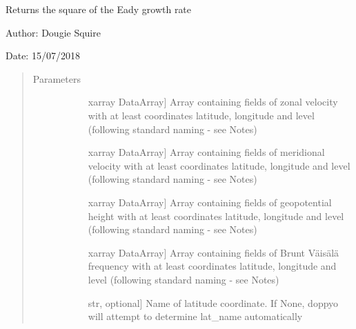 \documentclass[letterpaper,10pt,english]{sphinxmanual}
\begin{document}
\begin{fulllineitems}
\end{fulllineitems}


\begin{fulllineitems}
\label{\detokenize{diagnostic_doc:diagnostic.Eady_growth_rate}}
Returns the square of the Eady growth rate

\begin{DUlineblock}{0em}
\item[] Author: Dougie Squire
\item[] Date: 15/07/2018
\end{DUlineblock}
\begin{quote}\begin{description}
\item[{Parameters}] \leavevmode\begin{description}
\item[{}] \leavevmode{[}xarray DataArray{]}
Array containing fields of zonal velocity with at least coordinates latitude, longitude and                     level (following standard naming - see Notes)

\item[{}] \leavevmode{[}xarray DataArray{]}
Array containing fields of meridional velocity with at least coordinates latitude, longitude                     and level (following standard naming - see Notes)

\item[{}] \leavevmode{[}xarray DataArray{]}
Array containing fields of geopotential height with at least coordinates latitude, longitude                     and level (following standard naming - see Notes)

\item[{}] \leavevmode{[}xarray DataArray{]}
Array containing fields of Brunt Väisälä frequency with at least coordinates latitude,                     longitude and level (following standard naming - see Notes)

\item[{}] \leavevmode{[}str, optional{]}
Name of latitude coordinate. If None, doppyo will attempt to determine lat\_name                     automatically


\end{description}
\end{description}
\end{quote}
\end{fulllineitems}
\end{document}

